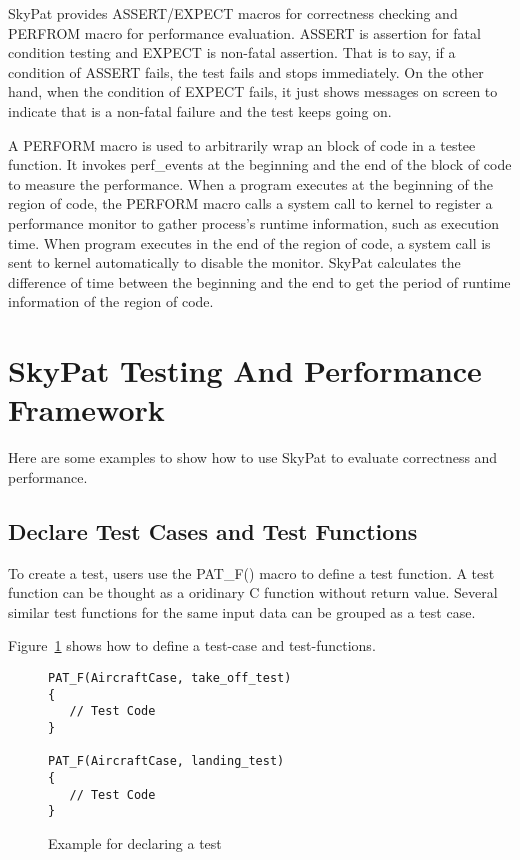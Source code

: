 \documentclass[final]{ols}
\begin{document}
SkyPat provides ASSERT/EXPECT macros for correctness checking and PERFROM macro for performance evaluation.
ASSERT is assertion for fatal condition testing and EXPECT is non-fatal assertion.
That is to say, if a condition of ASSERT fails, the test fails and stops immediately.
On the other hand, when the condition of EXPECT fails, it just shows messages on screen to indicate that is a non-fatal failure and the test keeps going on.

A PERFORM macro is used to arbitrarily wrap an block of code in a testee function.
It invokes perf\_events at the beginning and the end of the block of code to measure the performance.
When a program executes at the beginning of the region of code, the PERFORM macro calls a system call to kernel to register a performance monitor to gather process's runtime information, such as execution time.
When program executes in the end of the region of code, a system call is sent to kernel automatically to disable the monitor.
SkyPat calculates the difference of time between the beginning and the end to get the period of runtime information of the region of code.

\section{SkyPat Testing And Performance Framework}

Here are some examples to show how to use SkyPat to evaluate correctness and performance.

\subsection{Declare Test Cases and Test Functions}

To create a test, users use the PAT\_F() macro to define a test function.
A test function can be thought as a oridinary C function without return value.
Several similar test functions for the same input data can be grouped as a test case.

Figure~\ref{aircraftcase} shows how to define a test-case and test-functions.

\begin{figure}[h]
\lstset{language=C++}
\begin{lstlisting}[frame=single]
PAT_F(AircraftCase, take_off_test)
{
   // Test Code
}

PAT_F(AircraftCase, landing_test)
{
   // Test Code
}
\end{lstlisting}
\caption{Example for declaring a test}
\label{aircraftcase}
\end{figure}
\end{document}
